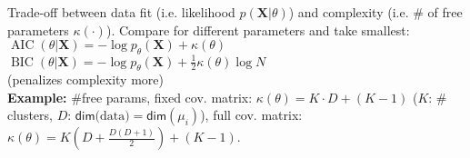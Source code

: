 Trade-off between data fit (i.e. likelihood $p(\mathbf{X} | \theta)$) and complexity (i.e. \# of free parameters $\kappa(\cdot)$). Compare for different parameters and take smallest:\\
$\operatorname{AIC}(\theta | \mathbf{X}) = -\log p_\theta(\mathbf{X}) + \kappa(\theta)$\\
$\operatorname{BIC}(\theta | \mathbf{X}) = -\log p_\theta(\mathbf{X}) + \frac{1}{2} \kappa(\theta) \log N$ \\
(penalizes complexity more)\\
\textbf{Example:} \#free params, fixed cov. matrix: $\kappa(\theta) = K \cdot D + (K - 1)$ ($K$: \# clusters, $D$: $\mathsf{dim}\text{(data)}=\mathsf{dim}(\mu_i)$), full cov. matrix: $\kappa(\theta) = K(D + \frac{D(D+1)}{2}) + (K - 1)$.